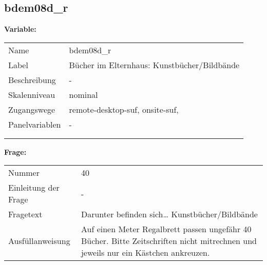 	
	
	\subsection{bdem08d\_r}
	\label{subSection:bdem08d_r}

	\noindent\textbf{Variable:}\\
		\begin{tabular}{lL{11.3cm}}
			\label{tableVariable:bdem08d_r}
			Name & bdem08d\_r \\
			Label & Bücher im Elternhaus: Kunstbücher/Bildbände \\
			Beschreibung & - \\
			Skalenniveau & nominal \\
			Zugangswege &
				remote-desktop-suf,
				onsite-suf,
 \\
			Panelvariablen & -
			 \\
			 \\
 \\
		\end{tabular}

		\vspace*{1 cm}
		\noindent\textbf{Frage:}\\
		\begin{tabular}{lL{11.3cm}}
			\label{tableQuestion:bdem08d_r}
			Nummer & 40 \\
			Einleitung der Frage & - \\
			Fragetext & Darunter befinden sich…
Kunstbücher/Bildbände \\
			Ausfüllanweisung & Auf einen Meter Regalbrett passen ungefähr 40 Bücher. Bitte Zeitschriften nicht mitrechnen und jeweils nur ein Kästchen ankreuzen. \\
		\end{tabular}





